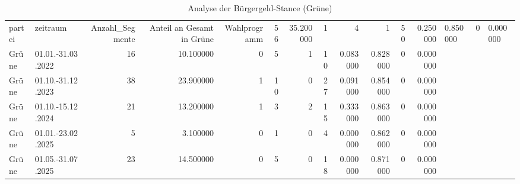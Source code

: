 \begin{table}
\caption{Analyse der Bürgergeld-Stance (Grüne)}
\label{tab:meine_tabelle}
\begin{tabular}{llrrrrrrrrrr}
\toprule
partei & zeitraum & Anzahl_Segmente & Anteil an Gesamt in %
\midrule
Grüne & Wahlprogramm & 56 & 35.200000 & 1 & 4 & 1 & 50 & 0.250000 & 0.850000 & 0 & 0.000000 \\
Grüne & 01.01.-31.03.2022 & 16 & 10.100000 & 0 & 5 & 1 & 10 & 0.083000 & 0.828000 & 0 & 0.000000 \\
Grüne & 01.10.-31.12.2023 & 38 & 23.900000 & 1 & 10 & 0 & 27 & 0.091000 & 0.854000 & 0 & 0.000000 \\
Grüne & 01.10.-15.12.2024 & 21 & 13.200000 & 1 & 3 & 2 & 15 & 0.333000 & 0.863000 & 0 & 0.000000 \\
Grüne & 01.01.-23.02.2025 & 5 & 3.100000 & 0 & 1 & 0 & 4 & 0.000000 & 0.862000 & 0 & 0.000000 \\
Grüne & 01.05.-31.07.2025 & 23 & 14.500000 & 0 & 5 & 0 & 18 & 0.000000 & 0.871000 & 0 & 0.000000 \\
\bottomrule
\end{tabular}
\end{table}
